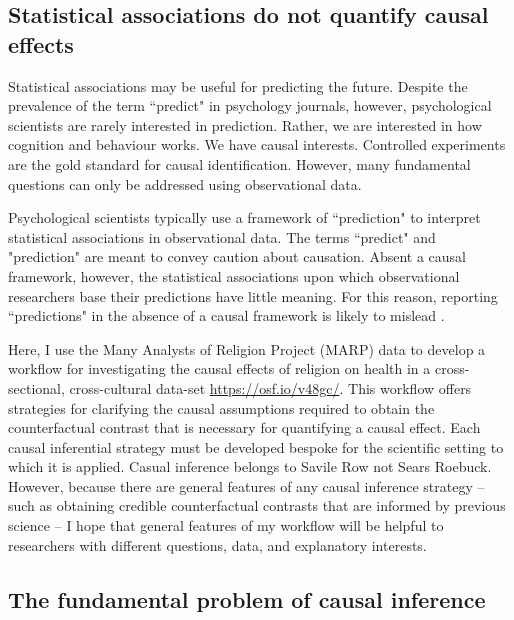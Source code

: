 \documentclass[]{interact}
\theoremstyle{plain}%
\theoremstyle{definition}
\theoremstyle{remark}
\begin{document}
\subsection{Statistical associations do not quantify causal effects}

Statistical associations may be useful for predicting the future. Despite the prevalence of the term ``predict" in psychology journals, however, psychological scientists are rarely interested in prediction. Rather, we are interested in how cognition and behaviour works. We have causal interests. Controlled experiments are the gold standard for causal identification. However, many fundamental questions can only be addressed using observational data.

Psychological scientists typically use a framework of ``prediction" to interpret statistical associations in observational data. The terms ``predict" and "prediction" are meant to convey caution about causation. Absent a causal framework, however, the statistical associations upon which observational researchers base their predictions have little meaning. For this reason, reporting “predictions" in the absence of a causal framework is likely to mislead \citep{westreich_table_2013,mcelreath_statistical_2020,pearl_causal_2009,hernan_c-word_2018,bulbulia_causal_2021,rohrer_thinking_2018,vanderweele_explanation_2015}.

Here, I use the Many Analysts of Religion Project (MARP) data to develop a workflow for investigating the causal effects of religion on health in a cross-sectional, cross-cultural data-set \href{https://osf.io/v48gc/}{https://osf.io/v48gc/}. This workflow offers strategies for clarifying the causal assumptions required to obtain the counterfactual contrast that is necessary for quantifying a causal effect. Each causal inferential strategy must be developed bespoke for the scientific setting to which it is applied. Casual inference belongs to Savile Row not Sears Roebuck. However, because there are general features of any causal inference strategy -- such as obtaining credible counterfactual contrasts that are informed by previous science -- I hope that general features of my workflow will be helpful to researchers with different questions, data, and explanatory interests. 

\subsection{The fundamental problem of causal inference}
\end{document}
